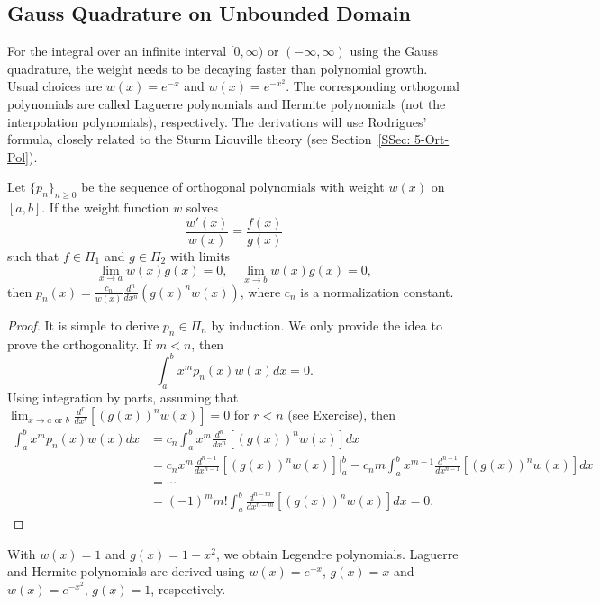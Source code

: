 \subsection{Gauss Quadrature on Unbounded Domain}
For the integral over an infinite interval $[0, \infty)$ or $(-\infty, \infty)$ using the Gauss quadrature, the weight needs to be decaying faster than polynomial growth. Usual choices are $w(x) = e^{-x}$ and $w(x) = e^{-x^2}$. The corresponding orthogonal polynomials are called Laguerre polynomials and Hermite polynomials (not the interpolation polynomials), respectively. The derivations will use Rodrigues' formula, closely related to the Sturm Liouville theory (see Section~\ref{SSec: 5-Ort-Pol}). 
\begin{theorem}
\label{Thm: 3-Rod-For}
    Let $\{p_n\}_{n\ge 0}$ be the sequence of orthogonal polynomials with weight $w(x)$ on $[a, b]$. If the weight function $w$ solves
    \begin{equation}
        \frac{w'(x)}{w(x)} = \frac{f(x)}{g(x)}
    \end{equation}
    such that $f\in \Pi_1$ and $g\in \Pi_2$ with limits 
    \begin{equation}
        \lim_{x\to a} w(x) g(x) = 0, \quad \lim_{x\to b} w(x) g(x) = 0,
    \end{equation}
    then $p_n(x) = \frac{c_n}{w(x)} \frac{d^n}{d x^n}\left( g(x)^n w(x) \right)$, where $c_n$ is a normalization constant.
\end{theorem}
\begin{proof}
    It is simple to derive $p_n\in\Pi_n$ by induction. We only provide the idea to prove the orthogonality. If $m < n$, then 
    \begin{equation}
        \int_{a}^b x^m p_n(x) w(x) dx = 0.
    \end{equation}
    Using integration by parts, assuming that $\lim_{x\to a \text{ or }b} \frac{d^r}{dx^r}\left[(g(x))^n w(x) \right] = 0$ for $r < n$ (see Exercise), then 
    \begin{equation}\nonumber
    \begin{aligned}
        \int_{a}^b x^m p_n(x) w(x) dx &=  c_n \int_a^b x^m \frac{d^n}{dx^n} \left[(g(x))^n w(x) \right] dx  \\
        &= c_n x^m \frac{d^{n-1}}{dx^{n-1}} \left[(g(x))^n w(x) \right] \Big|_{a}^b - c_n m \int_a^b x^{m-1} \frac{d^{n-1}}{dx^{n-1}} \left[(g(x))^n w(x) \right] dx\\
        &=\cdots \\
        &= (-1)^m m! \int_a^b \frac{d^{n-m}}{d x^{n-m}} \left[(g(x))^n w(x) \right] dx = 0.
    \end{aligned}
    \end{equation}
\end{proof}
With $w(x) = 1$ and $g(x) = 1-x^2$, we obtain Legendre polynomials. Laguerre and Hermite polynomials are derived using $w(x) = e^{-x}$, $g(x) = x$ and $w(x) = e^{-x^2}$, $g(x) = 1$, respectively.

